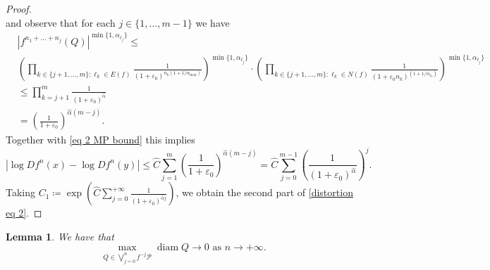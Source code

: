 \documentclass[10pt,a4paper]{amsart}
\numberwithin{equation}{section} %
\numberwithin{figure}{section} %
\newtheorem{lemm}[prop]{Lemma}
\renewcommand{\=}{\coloneqq}
\DeclareMathOperator{\diam}{diam}
\begin{document}
\begin{proof}
\begin{equation*}
    \end{equation*}
    and observe that for each $j\in\{1,\ldots,m-1\}$ we have
    \begin{equation*}
    \begin{split}
        &|f^{n_1+\ldots+n_j}(Q)|^{\min\{1,\alpha_{\ell_j}\}} \leq\\
        &\left(\prod_{k\in\{j+1,\ldots,m\}:\ell_k\in E(f)} \frac{1}{(1+\varepsilon_0)^{n_k(1+1/\alpha_{\max})}}\right)^{\min\{1,\alpha_{\ell_j}\}}\cdot\left(\prod_{k\in\{j+1,\ldots,m\}: \ell_k\in N(f)} \frac{1}{(1+\varepsilon_0 n_k)^{(1+1/\alpha_{\ell_k})}}\right)^{\min\{1,\alpha_{\ell_j}\}}\\
        &\leq  \prod_{k=j+1}^{m} \frac{1}{(1+\varepsilon_0)^{\widehat{\alpha}}}\\
       & = \left(\frac{1}{1+\varepsilon_0}\right)^{\widehat{\alpha}(m-j)}.
        \end{split}
    \end{equation*}
    Together with \eqref{eq 2 MP bound} this implies
    \begin{equation}
        |\log Df^n(x) - \log Df^n(y)| \leq \widehat{C}\sum_{j=1}^{m} \left(\frac{1}{1+\varepsilon_0}\right)^{\widehat{\alpha}(m-j)} = \widehat{C}\sum_{j=0}^{m-1} \left(\frac{1}{(1+\varepsilon_0)^{\widehat{\alpha}}}\right)^{j}. 
    \end{equation}
    Taking $C_1\= \exp(\widehat{C}\sum_{j=0}^{+\infty} \frac{1}{(1+\varepsilon_0)^{\widehat{\alpha}j}})$, we obtain the second part of \eqref{distortion eq 2}.
\end{proof}
\begin{lemm}\label{diam to 0}
    We have that
    \begin{equation}\label{diam to 0 eq0}
        \max_{Q\in\bigvee_{j=0}^{n}f^{-j}\mathcal{P}} \diam Q \to 0 \text{ as } n \to +\infty.
    \end{equation}
\end{lemm}
\end{document}
